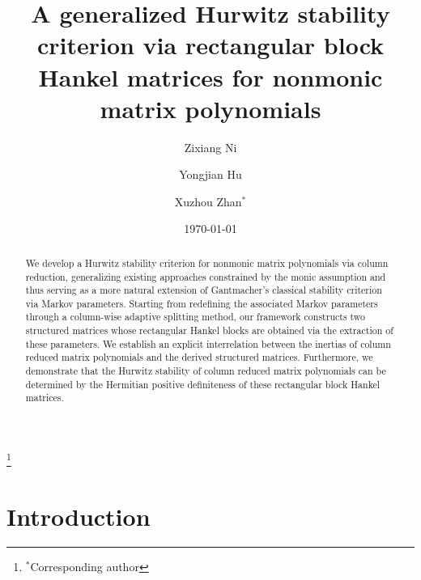 \documentclass[12pt,reqno]{amsart}
\theoremstyle{plain}
\numberwithin{equation}{section}
\theoremstyle{remark}
\begin{document}
\title{A generalized Hurwitz stability criterion via rectangular block Hankel matrices for nonmonic matrix polynomials}


\author{Zixiang Ni}  
\address{
Department of Mathematics, Beijing Normal University at Zhuhai,
    Zhuhai 519087, PR China
}


\author{Yongjian Hu}  
\address{
Department of Mathematics, Beijing Normal University at Zhuhai,
    Zhuhai 519087, PR China; School of Mathematical Sciences, Beijing Normal University, Beijing 100875, PR China
}

\author{Xuzhou Zhan$^\ast$} 
\address{
Department of Mathematics, Beijing Normal University at Zhuhai,
    Zhuhai 519087, PR China
}
\thanks{$^\ast$Corresponding author}


\date{\today}



\begin{abstract}
We develop a Hurwitz stability criterion for nonmonic matrix polynomials via column reduction, generalizing existing approaches constrained by the monic assumption and thus serving as a more natural extension of Gantmacher’s classical stability criterion via Markov parameters.
Starting from redefining the associated Markov parameters through a column-wise adaptive splitting method, our framework constructs two structured matrices whose rectangular Hankel blocks are obtained via the extraction of these parameters. 
We establish an explicit interrelation between the inertias of column reduced matrix polynomials and the derived structured matrices. Furthermore, we demonstrate that the Hurwitz stability of column reduced matrix polynomials can be determined by the Hermitian positive definiteness of these rectangular block Hankel matrices. 
\end{abstract}

\maketitle

\section{Introduction}\label{SectionIntro}
\end{document}
